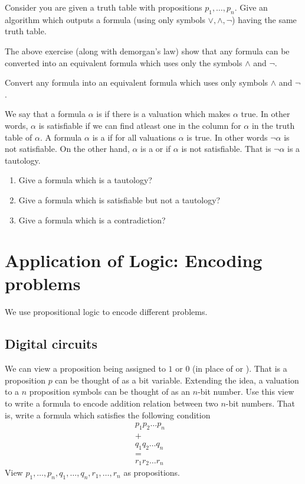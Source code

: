 \begin{exercise}
Consider you are given a truth table with propositions $p_1,\dots,p_n$. Give an algorithm which outputs a formula (using only symbols $\vee,\wedge, \neg$) having the same truth table.
\end{exercise}

The above exercise (along with demorgan's law) show that any formula can be converted into an equivalent formula which uses only the symbols $\wedge$ and $\neg$.

\begin{exercise}
Convert any formula into an equivalent formula which uses only symbols $\wedge$ and $\neg$.
\end{exercise}

We say that a formula $\alpha$ is  if there is a valuation which makes $\alpha$ true. In other words, $\alpha$ is satisfiable if we can find atleast one \true\/ in the column for $\alpha$ in the truth table of $\alpha$. A formula $\alpha$ is a  if for all valuations $\alpha$ is true. In other words $\neg \alpha$ is not satisfiable. On the other hand, $\alpha$ is a  or  if $\alpha$ is not satisfiable. That is $\neg \alpha$ is a tautology.
\begin{exercise}
\begin{enumerate}
\item Give a formula which is a tautology?
\item Give a formula which is satisfiable but not a tautology?
\item Give a formula which is a contradiction?
\end{enumerate}
\end{exercise}

\section[Encoding using logic]{Application of Logic: Encoding problems}
We use propositional logic to encode different problems.

\subsection{Digital circuits}
\begin{exercise}
We can view a proposition being assigned to $1$ or $0$ (in place of \true\/ or \false). That is a proposition $p$ can be thought of as a bit variable. Extending the idea, a valuation to a $n$ proposition symbols can be thought of as an $n$-bit number. Use this view to write a formula to encode addition relation between two $n$-bit numbers. That is, write a formula which satisfies the following condition
\begin{align*}
p_1p_2\dots p_n  \\
+ \\
q_1q_2 \dots q_n &  \\
= \\
r_1r_2 \dots r_n
\end{align*}
View $p_1,\dots,p_n,q_1,\dots,q_n,r_1,\dots,r_n$ as propositions.
\end{exercise}

